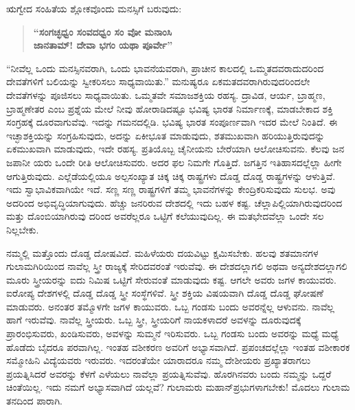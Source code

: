  ಋಗ್ವೇದ ಸಂಹಿತೆಯ ಶ್ಲೋಕವೊಂದು ಮನಸ್ಸಿಗೆ ಬರುವುದು:

\begin{verse}
\textbf{“ಸಂಗಚ್ಛಧ್ವಂ ಸಂವದಧ್ವಂ ಸಂ ವೋ ಮನಾಂಸಿ}\\\textbf{ಜಾನತಾಮ್​! ದೇವಾ ಭಗಂ ಯಥಾ ಪೂರ್ವೇ”}
\end{verse}

“ನೀವೆಲ್ಲ ಒಂದು ಮನಸ್ಸಿನವರಾಗಿ, ಒಂದು ಭಾವನೆಯವರಾಗಿ, ಪ್ರಾಚೀನ ಕಾಲದಲ್ಲಿ ಒಮ್ಮತದವರಾದುದರಿಂದ ದೇವತೆಗಳಿಗೆ ಬಲಿಯನ್ನು ಸ್ವೀಕರಿಸಲು ಸಾಧ್ಯವಾಯಿತು.” ಮನುಷ್ಯರೂ ಏಕಮತದವರಾಗಿರುವುದರಿಂದಲೇ ದೇವತೆಗಳನ್ನು ಪೂಜಿಸಲು ಸಾಧ್ಯವಾಯಿತು. ಒಮ್ಮತವೇ ಸಮಾಜಶಕ್ತಿಯ ರಹಸ್ಯ. ದ್ರಾವಿಡ, ಆರ್ಯ, ಬ್ರಾಹ್ಮಣ, ಬ್ರಾಹ್ಮಣೇತರ ಎಂಬ ಪ್ರಶ್ನೆಯ ಮೇಲೆ ನೀವು ಹೋರಾಡಿದಷ್ಟೂ ಭವಿಷ್ಯ ಭಾರತ ನಿರ್ಮಾಣಕ್ಕೆ, ಮಾಡಬೇಕಾದ ಶಕ್ತಿ ಸಂಗ್ರಹಕ್ಕೆ ದೂರವಾಗುವೆವು. ಇದನ್ನು ಗಮನದಲ್ಲಿಡಿ. ಭವಿಷ್ಯ ಭಾರತ ಸಂಪೂರ್ಣವಾಗಿ ಇದರ ಮೇಲೆ ನಿಂತಿದೆ. ಈ ಇಚ್ಛಾಶಕ್ತಿಯನ್ನು ಸಂಗ್ರಹಿಸುವುದು, ಅದನ್ನು ಏಕೀಭೂತ ಮಾಡುವುದು, ಶತಮುಖವಾಗಿ ಹರಿಯುತ್ತಿರುವುದನ್ನು ಏಕಮುಖವಾಗಿ ಮಾಡುವುದು, ಇದೇ ರಹಸ್ಯ. ಪ್ರತಿಯೊಬ್ಬ ಚೈನೀಯನು ಬೇರೆಯಾಗಿ ಆಲೋಚಿಸುವನು. ಕೆಲವು ಜನ ಜಪಾನೀ ಯರು ಒಂದೇ ರೀತಿ ಆಲೋಚಿಸುವರು. ಅದರ ಫಲ ನಿಮಗೇ ಗೊತ್ತಿದೆ. ಜಗತ್ತಿನ ಇತಿಹಾಸದಲ್ಲೆಲ್ಲಾ ಹೀಗೇ ಆಗುತ್ತಿರುವುದು. ಎಲ್ಲೆಡೆಯಲ್ಲಿಯೂ ಅಲ್ಪಸಂಖ್ಯಾತ ಚಿಕ್ಕ ಚಿಕ್ಕ ರಾಷ್ಟ್ರಗಳು ದೊಡ್ಡ ದೊಡ್ಡ ರಾಷ್ಟ್ರಗಳನ್ನು ಆಳುತ್ತಿವೆ. ಇದು ಸ್ವಾಭಾವಿಕವಾಗಿಯೇ ಇದೆ. ಸಣ್ಣ ಸಣ್ಣ ರಾಷ್ಟ್ರಗಳಿಗೆ ತಮ್ಮ ಭಾವನೆಗಳನ್ನು ಕೇಂದ್ರಿಕರಿಸುವುದು ಸುಲಭ. ಅವು ಅದರಿಂದ ಅಭಿವೃದ್ಧಿಯಾಗುವುದು. ಹೆಚ್ಚು ಜನರಿರುವ ದೇಶದಲ್ಲಿ ಇದು ಬಹಳ ಕಷ್ಟ. ಚೆಲ್ಲಾಪಿಲ್ಲಿಯಾಗಿರುವುದರಿಂದ ಮತ್ತು ದೊಂಬಿಯಾಗಿರುವು ದರಿಂದ ಅವರೆಲ್ಲರೂ ಒಟ್ಟಿಗೆ ಕಲೆಯುವುದಿಲ್ಲ. ಈ ಮತಭೇದವೆಲ್ಲಾ ಒಂದೇ ಸಲ ನಿಲ್ಲಬೇಕು. 

ನಮ್ಮಲ್ಲಿ ಮತ್ತೊಂದು ದೊಡ್ಡ ದೋಷವಿದೆ. ಮಹಿಳೆಯರು ದಯವಿಟ್ಟು ಕ್ಷಮಿಸಬೇಕು. ಹಲವು ಶತಮಾನಗಳ ಗುಲಾಮಗಿರಿಯಿಂದ ನಾವೆಲ್ಲ ಸ್ತ್ರೀ ರಾಜ್ಯಕ್ಕೆ ಸೇರಿದವರಂತೆ ಇರುವೆವು. ಈ ದೇಶದಲ್ಲಾಗಲಿ ಅಥವಾ ಅನ್ಯದೇಶದಲ್ಲಾಗಲಿ ಮೂರು ಸ್ತ್ರೀಯರನ್ನು ಐದು ನಿಮಿಷ ಒಟ್ಟಿಗೆ ಸೇರುವಂತೆ ಮಾಡುವುದು ಕಷ್ಟ. ಆಗಲೇ ಅವರು ಜಗಳ ಕಾಯುವರು. ಐರೋಪ್ಯ ದೇಶಗಳಲ್ಲಿ ದೊಡ್ಡ ದೊಡ್ಡ ಸ್ತ್ರೀ ಸಂಸ್ಥೆಗಳಿವೆ. ಸ್ತ್ರೀ ಶಕ್ತಿಯ ವಿಷಯವಾಗಿ ದೊಡ್ಡ ದೊಡ್ಡ ಘೋಷಣೆ ಮಾಡುವರು. ಅನಂತರ ತಮ್ಮೊಳಗೇ ಜಗಳ ಕಾಯುವರು. ಒಬ್ಬ ಗಂಡಸು ಬಂದು ಅವರನ್ನೆಲ್ಲ ಆಳುವನು. ನಾವೆಲ್ಲ ಹಾಗೆ ಇರುವೆವು. ನಾವೆಲ್ಲ ಸ್ತ್ರೀಯರು. ಒಬ್ಬ ಸ್ತ್ರೀ, ಸ್ತ್ರೀಯರಿಗೆ ನಾಯಕಳಾದರೆ ಅವಳನ್ನು ದೂರುವುದಕ್ಕೆ ಪ್ರಾರಂಭಿಸುವರು, ಖಂಡಿಸುವರು, ಅವಳನ್ನು ಸುಮ್ಮನೆ ಇರಿಸುವರು. ಒಬ್ಬ ಗಂಡಸು ಬಂದು ಅವರನ್ನು ಮಧ್ಯೆ ಮಧ್ಯೆ ಹೊಡೆದು ಬೈದರೂ ಪರವಾಗಿಲ್ಲ. ಇಂತಹ ವಶೀಕರಣ ಅವರಿಗೆ ಅಭ್ಯಾಸವಾಗಿದೆ. ಪ್ರಪಂಚದಲ್ಲೆಲ್ಲಾ ಇಂತಹ ವಶೀಕಾರಕ ಸಮ್ಮೋಹಿನಿ ವಿದ್ಯೆಯವರು ಇರುವರು. ಇದರಂತೆಯೇ ಯಾರಾದರೂ ನಮ್ಮ ದೇಶೀಯರು ಪ್ರಖ್ಯಾತರಾಗಲು ಪ್ರಯತ್ನಿಸಿದರೆ ಅವರನ್ನು ಕೆಳಗೆ ಎಳೆಯಲು ನಾವೆಲ್ಲಾ ಪ್ರಯತ್ನಿಸುವೆವು. ಹೊರಗಿನವರು ಬಂದು ನಮ್ಮನ್ನು ಒದ್ದರೆ ಚಿಂತೆಯಿಲ್ಲ. ಇದು ನಮಗೆ ಅಭ್ಯಾಸವಾಗಿದೆ ಯಲ್ಲವೆ? ಗುಲಾಮರು ಮಹಾನ್​ ಪ್ರಭುಗಳಾಗಬೇಕು! ಮೊದಲು ಗುಲಾಮ ತನದಿಂದ ಪಾರಾಗಿ. 

